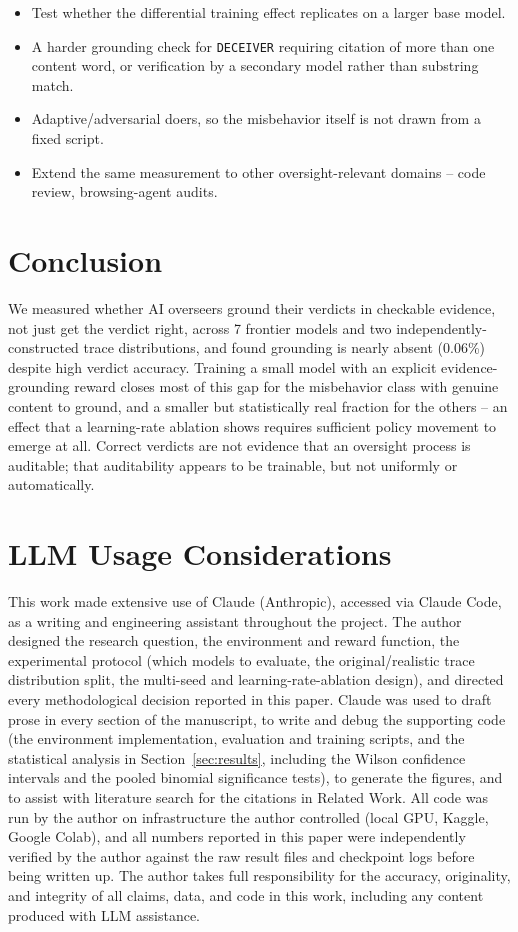 \documentclass[conference]{IEEEtran}
\begin{document}
\begin{itemize}
  \item Test whether the differential training effect replicates on a
    larger base model.
  \item A harder grounding check for \texttt{DECEIVER} requiring citation
    of more than one content word, or verification by a secondary model
    rather than substring match.
  \item Adaptive/adversarial doers, so the misbehavior itself is not drawn
    from a fixed script.
  \item Extend the same measurement to other oversight-relevant domains --
    code review, browsing-agent audits.
\end{itemize}

\section{Conclusion}

We measured whether AI overseers ground their verdicts in checkable
evidence, not just get the verdict right, across 7 frontier models and two
independently-constructed trace distributions, and found grounding is
nearly absent (0.06\%) despite high verdict accuracy. Training a small
model with an explicit evidence-grounding reward closes most of this gap
for the misbehavior class with genuine content to ground, and a smaller but
statistically real fraction for the others -- an effect that a
learning-rate ablation shows requires sufficient policy movement to emerge
at all. Correct verdicts are not evidence that an oversight process is
auditable; that auditability appears to be trainable, but not uniformly or
automatically.

\section*{LLM Usage Considerations}

This work made extensive use of Claude (Anthropic), accessed via Claude
Code, as a writing and engineering assistant throughout the project. The
author designed the research question, the environment and reward
function, the experimental protocol (which models to evaluate, the
original/realistic trace distribution split, the multi-seed and
learning-rate-ablation design), and directed every methodological decision
reported in this paper. Claude was used to draft prose in every section of
the manuscript, to write and debug the supporting code (the environment
implementation, evaluation and training scripts, and the statistical
analysis in Section~\ref{sec:results}, including the Wilson confidence
intervals and the pooled binomial significance tests), to generate the
figures, and to assist with literature search for the citations in Related
Work. All code was run by the author on infrastructure the author
controlled (local GPU, Kaggle, Google Colab), and all numbers reported in
this paper were independently verified by the author against the raw
result files and checkpoint logs before being written up. The author takes
full responsibility for the accuracy, originality, and integrity of all
claims, data, and code in this work, including any content produced with
LLM assistance.



\end{document}
